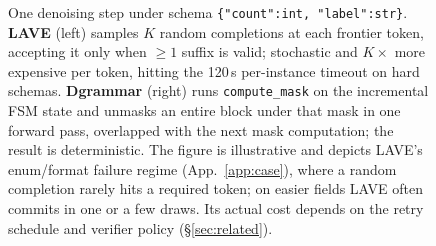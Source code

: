 \documentclass[11pt]{article}
\begin{document}
\begin{figure}[t]
\begin{minipage}[t]{0.49\linewidth}
\end{minipage}
\caption{One denoising step under schema \texttt{\{"count":int,\,"label":str\}}. \textbf{LAVE} \citep{lave2025} (left) samples $K$ random completions at each frontier token, accepting it only when $\geq\!1$ suffix is valid; stochastic and $K\!\times$ more expensive per token, hitting the 120\,s per-instance timeout on hard schemas. \textbf{Dgrammar} (right) runs \texttt{compute\_mask} on the incremental FSM state and unmasks an entire block under that mask in one forward pass, overlapped with the next mask computation; the result is deterministic. The figure is illustrative and depicts LAVE's enum/format failure regime (App.~\ref{app:case}), where a random completion rarely hits a required token; on easier fields LAVE often commits in one or a few draws. Its actual cost depends on the retry schedule and verifier policy (\S\ref{sec:related}).}
\label{fig:denoise-compare}
\end{figure}
\end{document}
